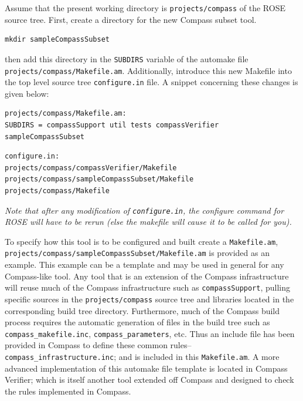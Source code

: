 Assume that the present working directory is {\tt projects/compass} of the ROSE
source tree. First, create a directory for the new Compass subset tool.
%
\begin{verbatim}
mkdir sampleCompassSubset
\end{verbatim}
%
then add this directory in the {\tt SUBDIRS} variable of the automake file
{\tt projects/compass/Makefile.am}. Additionally, introduce this new Makefile
into the top level source tree {\tt configure.in} file. A snippet concerning
these changes is given below:
%
\begin{verbatim}
projects/compass/Makefile.am:
SUBDIRS = compassSupport util tests compassVerifier sampleCompassSubset
\end{verbatim}
%
\begin{verbatim}
configure.in:
projects/compass/compassVerifier/Makefile
projects/compass/sampleCompassSubset/Makefile
projects/compass/Makefile
\end{verbatim}
%
{\it Note that after any modification of {\tt configure.in}, the configure command
for ROSE will have to be rerun (else the makefile will cause it to be called
for you).}

\vspace{0.2in}

To specify how this tool is to be configured and built create a {\tt Makefile.am},
{\tt projects/compass/sampleCompassSubset/Makefile.am} is provided as an example.
This example can be a template and may be used in general for any Compass-like tool.
Any tool that is an extension of the Compass infrastructure will reuse much of 
the Compass infrastructure such as {\tt compassSupport}, pulling specific sources in
the {\tt projects/compass} source tree and libraries located in the 
corresponding build tree directory. Furthermore, much of the Compass build
process requires the automatic generation of files in the build tree such
as {\tt compass\_makefile.inc}, {\tt compass\_parameters}, etc. Thus an
include file has been provided in Compass to define these common rules--
{\tt compass\_infrastructure.inc}; and is included in this {\tt Makefile.am}.
A more advanced implementation of this automake file template is located in
Compass Verifier; which is itself another tool extended off Compass and
designed to check the rules implemented in Compass.

